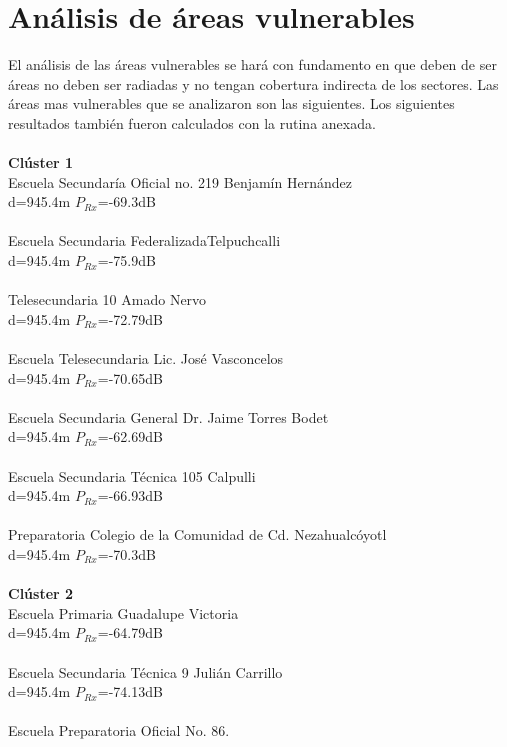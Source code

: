 \documentclass[11pt,letterpaper]{article}
\begin{document}
\newpage
\section{Análisis de áreas vulnerables}
El análisis de las áreas vulnerables se hará con fundamento en que deben de ser 
áreas no deben ser radiadas y no tengan cobertura indirecta de los sectores. Las 
áreas mas vulnerables que se analizaron son las siguientes. Los siguientes resultados también 
fueron calculados con la rutina anexada. 
\\ \\
\textbf{Clúster 1}
\\
Escuela Secundaría Oficial no. 219 Benjamín Hernández
\\
d=945.4m \quad $P_{Rx}$=-69.3dB
\\ \\
Escuela Secundaria FederalizadaTelpuchcalli
\\
d=945.4m \quad $P_{Rx}$=-75.9dB
\\ \\
Telesecundaria 10 Amado Nervo
\\ 
d=945.4m \quad $P_{Rx}$=-72.79dB
\\ \\
Escuela Telesecundaria Lic. José Vasconcelos
\\ 
d=945.4m \quad $P_{Rx}$=-70.65dB
\\ \\
Escuela Secundaria General Dr. Jaime Torres Bodet
\\ 
d=945.4m \quad $P_{Rx}$=-62.69dB
\\ \\
Escuela Secundaria Técnica 105 Calpulli
\\
d=945.4m \quad $P_{Rx}$=-66.93dB
\\ \\
Preparatoria Colegio de la Comunidad de Cd. Nezahualcóyotl
\\
d=945.4m \quad $P_{Rx}$=-70.3dB
\\ \\
\textbf{Clúster	2}
\\
Escuela Primaria Guadalupe Victoria
\\
d=945.4m \quad $P_{Rx}$=-64.79dB
\\ \\
Escuela Secundaria Técnica 9 Julián Carrillo
\\
d=945.4m \quad $P_{Rx}$=-74.13dB
\\ \\
Escuela Preparatoria Oficial No. 86.
\end{document}
